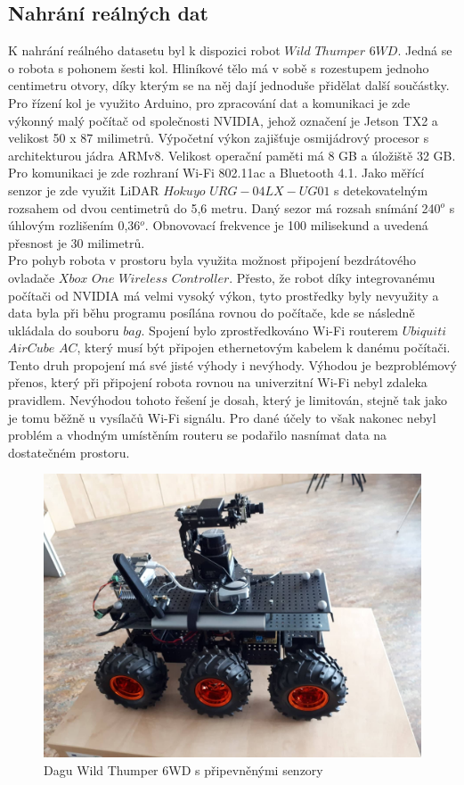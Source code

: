 \documentclass[12pt]{report}
\begin{document}
\subsection{Nahrání reálných dat}
K nahrání reálného datasetu byl k dispozici robot $Wild$ $Thumper$ $6WD$. Jedná se o robota s pohonem šesti kol. Hliníkové tělo má v sobě s rozestupem jednoho centimetru otvory, díky kterým se na něj dají jednoduše přidělat další součástky. \\
\indent Pro řízení kol je využito Arduino, pro zpracování dat a komunikaci je zde výkonný malý počítač od společnosti NVIDIA, jehož označení je Jetson TX2 a velikost 50 x 87 milimetrů. Výpočetní výkon zajišťuje osmijádrový procesor s architekturou jádra ARMv8. Velikost operační paměti má 8 GB a úložiště 32 GB. Pro komunikaci je zde rozhraní Wi-Fi 802.11ac a Bluetooth 4.1. Jako měřící senzor je zde využit LiDAR $Hokuyo$ $URG-04LX-UG01$ s detekovatelným rozsahem od dvou centimetrů do 5,6 metru. Daný sezor má rozsah snímání 240$^o$ s úhlovým rozlišením 0,36$^o$. Obnovovací frekvence je 100 milisekund a uvedená přesnost je 30 milimetrů.\\
\indent Pro pohyb robota v prostoru byla využita možnost připojení bezdrátového ovladače $Xbox$ $One$ $Wireless$ $Controller$. Přesto, že robot díky integrovanému počítači od NVIDIA má velmi vysoký výkon, tyto prostředky byly nevyužity a data byla při běhu programu posílána rovnou do počítače, kde se následně ukládala do souboru $bag$. Spojení bylo zprostředkováno Wi-Fi routerem $Ubiquiti$ $AirCube$ $AC$, který musí být připojen ethernetovým kabelem k danému počítači. Tento druh propojení má své jisté výhody i nevýhody. Výhodou je bezproblémový přenos, který při připojení robota rovnou na univerzitní Wi-Fi nebyl zdaleka pravidlem. Nevýhodou tohoto řešení je dosah, který je limitován, stejně tak jako je tomu běžně u vysílačů Wi-Fi signálu. Pro dané účely to však nakonec nebyl problém a vhodným umístěním routeru se podařilo nasnímat data na dostatečném prostoru. 

\begin{figure}[!ht]
	\begin{center}
		\includegraphics[width=0.7\columnwidth]{imgs/robot.jpg}
	\end{center}
	\caption{Dagu Wild Thumper 6WD s připevněnými senzory}
	\label{fig:robot}
\end{figure}
\end{document}
